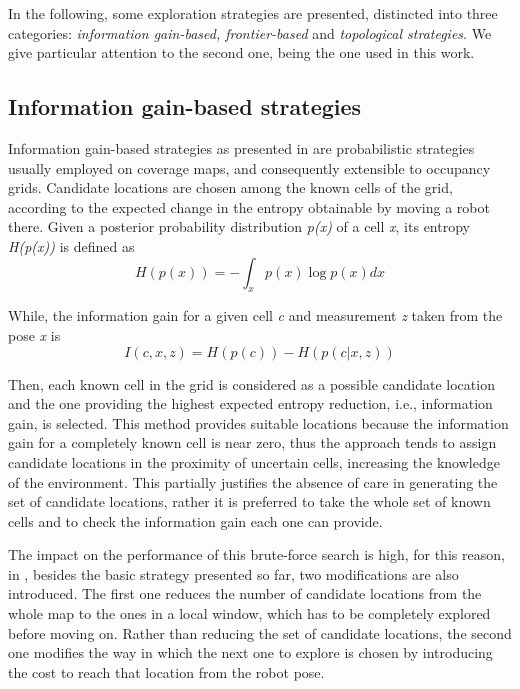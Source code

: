 In the following, some exploration strategies are presented, distincted
into three categories: \emph{information gain-based, frontier-based
}and \emph{topological strategies}. We give particular attention to
the second one, being the one used in this work.

\subsection{Information gain-based strategies}

Information gain-based strategies as presented in \cite{Stachniss2009}
are probabilistic strategies usually employed on coverage maps, and
consequently extensible to occupancy grids. Candidate locations are
chosen among the known cells of the grid, according to the expected
change in the entropy obtainable by moving a robot there. Given a
posterior probability distribution \emph{p(x) }of a cell \emph{x},
its entropy \emph{H(p(x)) }is defined as 
\[
H\left(p\left(x\right)\right)=-\int_{x}p\left(x\right)\log p\left(x\right)dx
\]

While, the information gain for a given cell \emph{c }and measurement
\emph{z }taken from the pose \emph{x }is 
\[
I\left(c,x,z\right)=H\left(p\left(c\right)\right)-H\left(p\left(c|x,z\right)\right)
\]

Then, each known cell in the grid is considered as a possible candidate
location and the one providing the highest expected entropy reduction,
i.e., information gain, is selected. This method provides suitable
locations because the information gain for a completely known cell
is near zero, thus the approach tends to assign candidate locations
in the proximity of uncertain cells, increasing the knowledge of the
environment. This partially justifies the absence of care in generating
the set of candidate locations, rather it is preferred to take the
whole set of known cells and to check the information gain each one
can provide. 

The impact on the performance of this brute-force search is high,
for this reason, in \cite{Stachniss2009}, besides
the basic strategy presented so far, two modifications are also introduced.
The first one reduces the number of candidate locations from the whole
map to the ones in a local window, which has to be completely explored
before moving on. Rather than reducing the set of candidate locations,
the second one modifies the way in which the next one to explore is
chosen by introducing the cost to reach that location from the robot
pose. 

